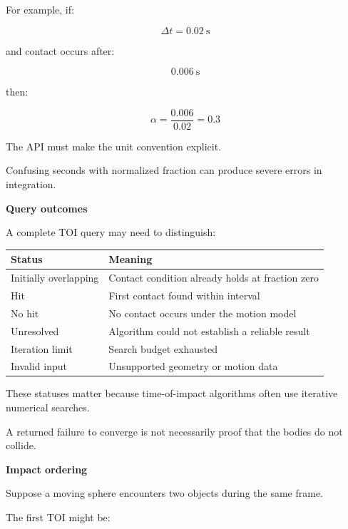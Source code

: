 For example, if:

\[
\Delta t=0.02\ \mathrm{s}
\]

and contact occurs after:

\[
0.006\ \mathrm{s}
\]

then:

\[
\alpha=\frac{0.006}{0.02}=0.3
\]

The API must make the unit convention explicit.

Confusing seconds with normalized fraction can produce severe errors in integration.

\textbf{Query outcomes}

A complete TOI query may need to distinguish:

{\def\LTcaptype{none} %
\begin{longtable}[]{@{}
  >{\raggedright\arraybackslash}p{}
  >{\raggedright\arraybackslash}p{}@{}}
\toprule\noalign{}
\begin{minipage}[b]{\linewidth}\raggedright
Status
\end{minipage} & \begin{minipage}[b]{\linewidth}\raggedright
Meaning
\end{minipage} \\
\midrule\noalign{}
\endhead
\bottomrule\noalign{}
\endlastfoot
Initially overlapping & Contact condition already holds at fraction zero \\
Hit & First contact found within interval \\
No hit & No contact occurs under the motion model \\
Unresolved & Algorithm could not establish a reliable result \\
Iteration limit & Search budget exhausted \\
Invalid input & Unsupported geometry or motion data \\
\end{longtable}
}

These statuses matter because time-of-impact algorithms often use iterative numerical searches.

A returned failure to converge is not necessarily proof that the bodies do not collide.

\textbf{Impact ordering}

Suppose a moving sphere encounters two objects during the same frame.

The first TOI might be:


